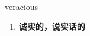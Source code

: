 
\begin{frame}
{\huge veracious}
\begin{center}
\begin{enumerate}\Large
  \item \textbf{诚实的，说实话的}
\end{enumerate}
\end{center}
\end{frame}
